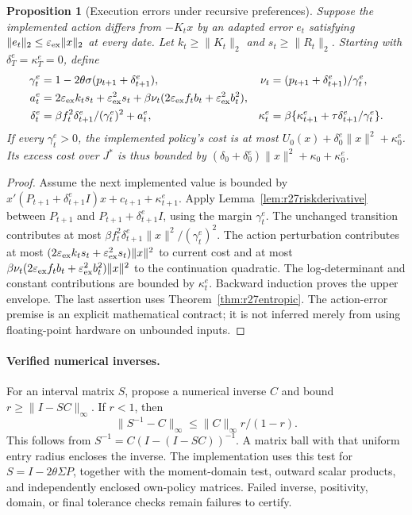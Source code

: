\documentclass[ecta,nameyear,draft]{econsocart}
\newtheorem{proposition}[theorem]{Proposition}
\theoremstyle{definition}
\theoremstyle{remark}
\begin{document}
\begin{proposition}[Execution errors under recursive preferences]
\label{prop:r27riskexecution}
Suppose the implemented action differs from $-K_tx$ by an adapted error
$e_t$ satisfying $\|e_t\|_2\leq\varepsilon_{\rm ex}\|x\|_2$ at every date.
Let $k_t\geq\|K_t\|_2$ and $s_t\geq\|R_t\|_2$.
Starting with $\delta_T^e=\kappa_T^e=0$, define
\begin{align*}
 \gamma_t^e&=1-2\theta\sigma(p_{t+1}+\delta_{t+1}^e),&
 \nu_t&=(p_{t+1}+\delta_{t+1}^e)/\gamma_t^e,\\
 a_t^e&=2\varepsilon_{\rm ex}k_ts_t+
             \varepsilon_{\rm ex}^2s_t
       +\beta\nu_t(2\varepsilon_{\rm ex}f_tb_t+
                         \varepsilon_{\rm ex}^2b_t^2),\\
 \delta_t^e&=\beta f_t^2\delta_{t+1}^e/(\gamma_t^e)^2+a_t^e,&
 \kappa_t^e&=\beta\{\kappa_{t+1}^e+
                    \tau\delta_{t+1}^e/\gamma_t^e\}.
\end{align*}
If every $\gamma_t^e>0$, the implemented policy's cost is at most
$U_0(x)+\delta_0^e\|x\|^2+\kappa_0^e$. Its excess cost over $J^*$ is thus
bounded by $(\delta_0+\delta_0^e)\|x\|^2+\kappa_0+\kappa_0^e$.
\end{proposition}
\begin{proof}
Assume the next implemented value is bounded by
$x'(P_{t+1}+\delta_{t+1}^eI)x+c_{t+1}+\kappa_{t+1}^e$.
Apply Lemma~\ref{lem:r27riskderivative} between $P_{t+1}$ and
$P_{t+1}+\delta_{t+1}^eI$, using the margin $\gamma_t^e$.
The unchanged transition contributes at most
$\beta f_t^2\delta_{t+1}^e\|x\|^2/(\gamma_t^e)^2$.
The action perturbation contributes at most
$(2\varepsilon_{\rm ex}k_ts_t+\varepsilon_{\rm ex}^2s_t)\|x\|^2$
to current cost and at most
$\beta\nu_t(2\varepsilon_{\rm ex}f_tb_t+
\varepsilon_{\rm ex}^2b_t^2)\|x\|^2$ to the continuation quadratic.
The log-determinant and constant contributions are bounded by
$\kappa_t^e$. Backward induction proves the upper envelope. The last assertion
uses Theorem~\ref{thm:r27entropic}. The action-error premise is an explicit
mathematical contract; it is not inferred merely from using floating-point
hardware on unbounded inputs.
\end{proof}

\paragraph{Verified numerical inverses.}
For an interval matrix $S$, propose a numerical inverse $C$ and bound
$r\geq\|I-SC\|_\infty$. If $r<1$, then
\[
 \|S^{-1}-C\|_\infty\leq\|C\|_\infty r/(1-r).
\]
This follows from $S^{-1}=C(I-(I-SC))^{-1}$. A matrix ball with that uniform
entry radius encloses the inverse. The implementation uses this test for
$S=I-2\theta\Sigma P$, together with the moment-domain test, outward scalar
products, and independently enclosed own-policy matrices. Failed inverse,
positivity, domain, or final tolerance checks remain failures to certify.
\end{document}
